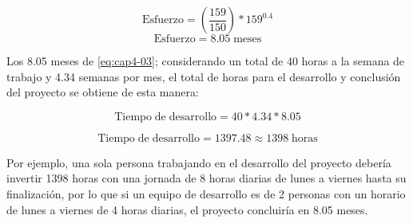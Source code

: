 \begin{equation} \label{eq:cap4-02}
	\mathrm{Esfuerzo} = (\frac{159}{150})*159^{0.4}
\end{equation}
\begin{equation} \label{eq:cap4-03}
	\mathrm{Esfuerzo} = 8.05 \; \mathrm{meses}
\end{equation}
	



Los 8.05 meses de \eqref{eq:cap4-03}; considerando un total de 40 horas a la semana de trabajo y 4.34 semanas por mes, el total de horas para el desarrollo y conclusión del proyecto se obtiene de esta manera:

\begin{equation} \label{eq:cap4-04}
	\mathrm{Tiempo\; de\; desarrollo} =  40 * 4.34 * 8.05 
\end{equation}

\begin{equation} \label{eq:cap4-05}
	\mathrm{Tiempo\; de\; desarrollo} =  1397.48 \approx 1398\;  \mathrm{horas}
\end{equation}

	



Por ejemplo, una sola persona trabajando en el desarrollo del proyecto debería invertir 1398 horas con una jornada de 8 horas diarias de lunes a viernes hasta su finalización, por lo que si un equipo de desarrollo es de 2 personas con un horario de lunes a viernes de 4 horas diarias, el proyecto concluiría en 8.05 meses.

